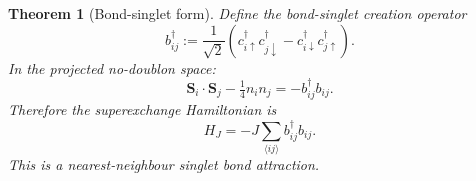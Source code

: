 \documentclass[12pt]{article}
\theoremstyle{plain}
\newtheorem{theorem}{Theorem}[section]
\theoremstyle{definition}
\numberwithin{equation}{section}
\begin{document}
\begin{theorem}[Bond-singlet form]\label{thm:bondsinglet}
Define the bond-singlet creation operator
\begin{equation}\label{eq:bondsinglet}
b_{ij}^\dagger := \frac{1}{\sqrt{2}}
\left(c_{i\uparrow}^\dagger c_{j\downarrow}^\dagger
- c_{i\downarrow}^\dagger c_{j\uparrow}^\dagger\right).
\end{equation}
In the projected no-doublon space:
\begin{equation}\label{eq:singletid}
\bm{S}_i\cdot\bm{S}_j - \tfrac{1}{4}n_in_j
= -b_{ij}^\dagger b_{ij}.
\end{equation}
Therefore the superexchange Hamiltonian is
\begin{equation}\label{eq:HJ}
\boxed{H_J = -J\sum_{\langle ij\rangle}b_{ij}^\dagger b_{ij}.}
\end{equation}
This is a nearest-neighbour singlet bond \emph{attraction}.
\end{theorem}
\end{document}
